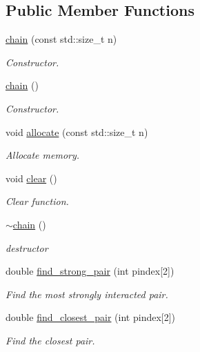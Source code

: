 \subsection*{Public Member Functions}
\begin{DoxyCompactItemize}
\item 
\hyperlink{classARC_1_1chain_adfb48948fb46b51913dd0a52bee18f2f}{chain} (const std\+::size\+\_\+t n)
\begin{DoxyCompactList}\small\item\em Constructor. \end{DoxyCompactList}\item 
\hyperlink{classARC_1_1chain_a032d2d203f6e6c7d801a37c5d0a7e8d4}{chain} ()
\begin{DoxyCompactList}\small\item\em Constructor. \end{DoxyCompactList}\item 
void \hyperlink{classARC_1_1chain_ad0abd7b957e9d88ad2f1823f06d28a4a}{allocate} (const std\+::size\+\_\+t n)
\begin{DoxyCompactList}\small\item\em Allocate memory. \end{DoxyCompactList}\item 
void \hyperlink{classARC_1_1chain_a5299fa50788dc7e5d15504c33f76333f}{clear} ()
\begin{DoxyCompactList}\small\item\em Clear function. \end{DoxyCompactList}\item 
\hyperlink{classARC_1_1chain_a3467a68afb2daebec6c57899897a461c}{$\sim$chain} ()
\begin{DoxyCompactList}\small\item\em destructor \end{DoxyCompactList}\item 
double \hyperlink{classARC_1_1chain_aacb06e4f2129d5f887f1a62553aa24dc}{find\+\_\+strong\+\_\+pair} (int pindex\mbox{[}2\mbox{]})
\begin{DoxyCompactList}\small\item\em Find the most strongly interacted pair. \end{DoxyCompactList}\item 
double \hyperlink{classARC_1_1chain_a75f1fdf8ffebcb57b5bcf26e29c84fca}{find\+\_\+closest\+\_\+pair} (int pindex\mbox{[}2\mbox{]})
\begin{DoxyCompactList}\small\item\em Find the closest pair. \end{DoxyCompactList}\item 

\end{DoxyCompactItemize}
